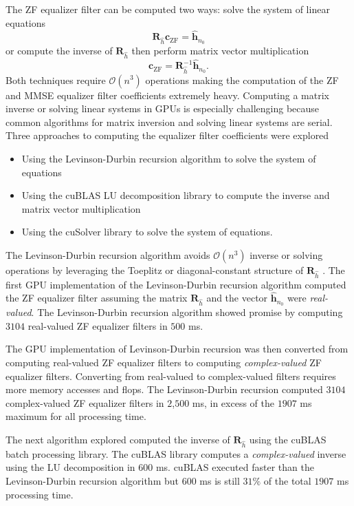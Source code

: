 The ZF equalizer filter can be computed two ways: solve the system of linear equations 
\begin{equation}
\mathbf{R}_{\hat{h}} \mathbf{c}_\text{ZF} = \hat{\mathbf{h}}_{n_0}
\label{eq:start_here_ZF_gpuimp}
\end{equation}
or compute the inverse of $\mathbf{R}_{\hat{h}}$ then perform matrix vector multiplication
\begin{equation}
\mathbf{c}_\text{ZF} =\mathbf{R}^{-1}_{\hat{h}} \hat{\mathbf{h}}_{n_0}.
\label{eq:c_ZF_direct}
\end{equation}
Both techniques require $\mathcal{O}(n^3)$ operations making the computation of the ZF and MMSE equalizer filter coefficients extremely heavy.
Computing a matrix inverse or solving linear systems in GPUs is especially challenging because common algorithms for matrix inversion and solving linear systems are serial.
Three approaches to computing the equalizer filter coefficients were explored
\begin{itemize}
\item Using the Levinson-Durbin recursion algorithm to solve the system of equations
\item Using the cuBLAS LU decomposition library to compute the inverse and matrix vector multiplication
\item Using the cuSolver library to solve the system of equations.
\end{itemize}

The Levinson-Durbin recursion algorithm avoids $\mathcal{O}(n^3)$ inverse or solving operations by leveraging the Toeplitz or diagonal-constant structure of $\mathbf{R}_{\hat{h}}$ \cite[Chap. 5]{hayes:1996}.
The first GPU implementation of the Levinson-Durbin recursion algorithm computed the ZF equalizer filter assuming the matrix $\mathbf{R}_{\hat{h}}$ and the vector $\hat{\mathbf{h}}_{n_0}$ were \textit{real-valued}.
The Levinson-Durbin recursion algorithm showed promise by computing $3104$ real-valued ZF equalizer filters in $500$ ms.

The GPU implementation of Levinson-Durbin recursion was then converted from computing real-valued ZF equalizer filters to computing \textit{complex-valued} ZF equalizer filters.
Converting from real-valued to complex-valued filters requires more memory accesses and flops.
The Levinson-Durbin recursion computed $3104$ complex-valued ZF equalizer filters in $2$,$500$ ms, in excess of the $1907$ ms maximum for all processing time.

The next algorithm explored computed the inverse of $\mathbf{R}_{\hat{h}}$ using the cuBLAS batch processing library.
The cuBLAS library computes a \textit{complex-valued} inverse using the LU decomposition in $600$ ms.
cuBLAS executed faster than the Levinson-Durbin recursion algorithm but $600$ ms is still $31\%$ of the total $1907$ ms processing time.

